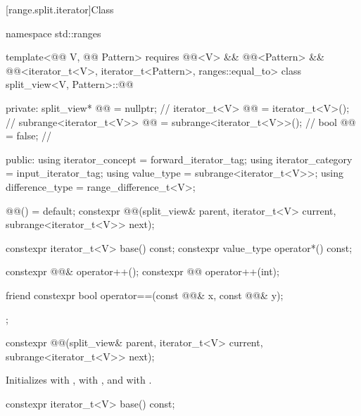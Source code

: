 [range.split.iterator]{Class }

%
\begin{codeblock}
namespace std::ranges {
  template<@@ V, @@ Pattern>
    requires @@<V> && @@<Pattern> &&
             @@<iterator_t<V>, iterator_t<Pattern>, ranges::equal_to>
  class split_view<V, Pattern>::@@ {
  private:
    split_view* @@ = nullptr;                              // \expos
    iterator_t<V> @@ = iterator_t<V>();                       // \expos
    subrange<iterator_t<V>> @@ = subrange<iterator_t<V>>();  // \expos
    bool @@ = false;                               // \expos

  public:
    using iterator_concept = forward_iterator_tag;
    using iterator_category = input_iterator_tag;
    using value_type = subrange<iterator_t<V>>;
    using difference_type = range_difference_t<V>;

    @@() = default;
    constexpr @@(split_view& parent, iterator_t<V> current, subrange<iterator_t<V>> next);

    constexpr iterator_t<V> base() const;
    constexpr value_type operator*() const;

    constexpr @@& operator++();
    constexpr @@ operator++(int);

    friend constexpr bool operator==(const @@& x, const @@& y);
  };
}
\end{codeblock}

%
\begin{itemdecl}
constexpr @@(split_view& parent, iterator_t<V> current, subrange<iterator_t<V>> next);
\end{itemdecl}

\begin{itemdescr}
\pnum
\effects
Initializes  with ,
 with , and
 with .
\end{itemdescr}

%
\begin{itemdecl}
constexpr iterator_t<V> base() const;
\end{itemdecl}

